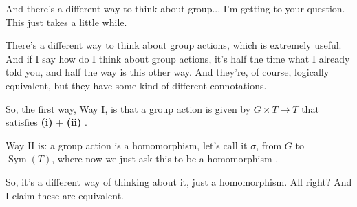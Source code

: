 \begin{speech}[01:07:38 - 01:08:56]
And there's a different way to think about group... I'm getting to your question.  This just takes a little while.

There's a different way to think about group actions, which is extremely useful. And if I say how do I think about group actions, it's half the time what I already told you, and half the way is this other way. And they're, of course, logically equivalent, but they have some kind of different connotations.

So, the first way, Way I, is that a group action is given by $G \times T \to T$ that satisfies \textbf{(i)} $+$ \textbf{(ii)} .

Way II is: a group action is a homomorphism, let's call it $\sigma$, from $G$ to $\operatorname{Sym}(T)$, where now we just ask this to be a homomorphism .

So, it's a different way of thinking about it, just a homomorphism. All right? And I claim these are equivalent.
\end{speech}

\begin{content}
\end{content}

